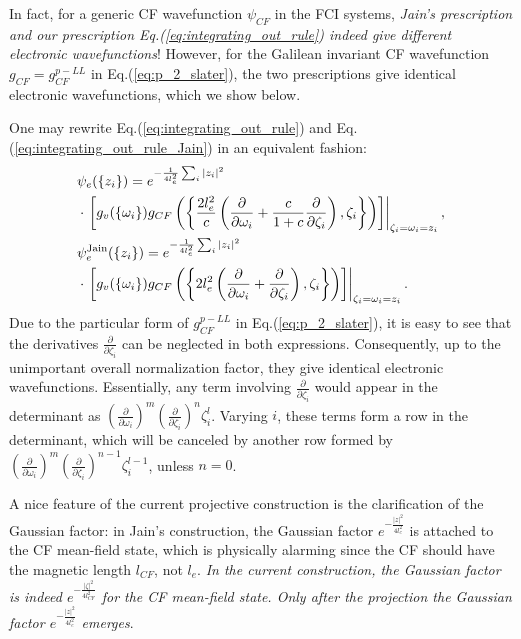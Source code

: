 In fact, for a generic CF wavefunction $\psi_{CF}$ in the FCI systems, \emph{Jain's prescription and our prescription Eq.(\ref{eq:integrating_out_rule}) indeed give different electronic wavefunctions}! However, for the Galilean invariant CF wavefunction $g_{CF}=g_{CF}^{p-LL}$ in Eq.(\ref{eq:p_2_slater}), the two prescriptions give identical electronic wavefunctions, which we show below.

One may rewrite Eq.(\ref{eq:integrating_out_rule}) and Eq.(\ref{eq:integrating_out_rule_Jain}) in an equivalent fashion:
\begin{align}
&\psi_e(\{z_i\})=e^{-\frac{1}{4l_e^2}\sum_i |z_i|^2}\notag\\
&\cdot \left.\left[g_v(\{\omega_i\})g_{CF}\left(\left\{\frac{2l_e^2}{c}\left(\frac{\partial}{\partial \omega_i}+\frac{c}{1+c}\frac{\partial}{\partial \zeta_i}\right),\zeta_i\right\}\right)\right]\right|_{\zeta_i=\omega_i=z_i},\notag\\
&\psi^{\text{Jain}}_e(\{z_i\})=e^{-\frac{1}{4l_e^2}\sum_i |z_i|^2}\notag\\
&\cdot \left.\left[g_v(\{\omega_i\})g_{CF}\left(\left\{2l_e^2\left(\frac{\partial}{\partial \omega_i}+\frac{\partial}{\partial \zeta_i}\right), \zeta_i\right\}\right)\right]\right|_{\zeta_i=\omega_i=z_i}.
\end{align}
Due to the particular form of $g^{p-LL}_{CF}$ in Eq.(\ref{eq:p_2_slater}), it is easy to see that the derivatives $\frac{\partial}{\partial \zeta_i}$ can be neglected in both expressions. Consequently, up to the unimportant overall normalization factor, they give identical electronic wavefunctions. Essentially, any term involving $\frac{\partial}{\partial \zeta_i}$ would appear in the determinant as $(\frac{\partial}{\partial\omega_i})^m (\frac{\partial}{\partial\zeta_i})^n \zeta_i^l$. Varying $i$, these terms form a row in the determinant, which will be canceled by another row formed by $(\frac{\partial}{\partial\omega_i})^m (\frac{\partial}{\partial\zeta_i})^{n-1} \zeta_i^{l-1}$, unless $n=0$. 


A nice feature of the current projective construction is the clarification of the Gaussian factor: in Jain's construction, the Gaussian factor $e^{-\frac{|z|^2}{4l_e^2}}$ is attached to the CF mean-field state, which is physically alarming since the CF should have the magnetic length $l_{CF}$, not $l_e$. \emph{In the current construction, the Gaussian factor is indeed $e^{-\frac{|\zeta|^2}{4l_{CF}^2}}$ for the CF mean-field state. Only after the projection the Gaussian factor $e^{-\frac{|z|^2}{4l_e^2}}$ emerges}.



